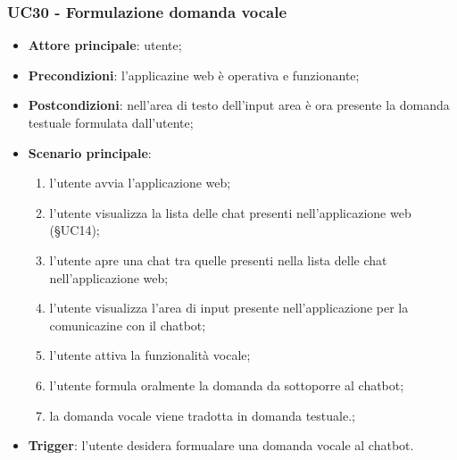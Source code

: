 \documentclass[10pt, a4paper]{article}
\begin{document}
    \subsubsection{UC30 - Formulazione domanda vocale}
    \begin{itemize}
        \item \textbf{Attore principale}: utente;
        \item \textbf{Precondizioni}: l'applicazine web è operativa e funzionante;
        \item \textbf{Postcondizioni}: nell'area di testo dell'input area è ora presente la domanda testuale formulata dall'utente;
        \item \textbf{Scenario principale}:
            \begin{enumerate}
                \item l'utente avvia l'applicazione web;
                \item l'utente visualizza la lista delle chat presenti nell'applicazione web (\S UC14);
                \item l'utente apre una chat tra quelle presenti nella lista delle chat nell'applicazione web;
                \item l'utente visualizza l'area di input presente nell'applicazione per la comunicazine con il chatbot;
                \item l'utente attiva la funzionalità vocale;
                \item l'utente formula oralmente la domanda da sottoporre al chatbot;
                \item la domanda vocale viene tradotta in domanda testuale.;
            \end{enumerate}
        \item \textbf{Trigger}: l'utente desidera formualare una domanda vocale al chatbot.
    \end{itemize}



\newpage
\end{document}
